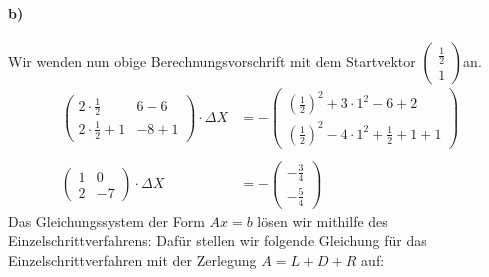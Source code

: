 \paragraph{b)}
Wir wenden nun obige Berechnungsvorschrift mit dem Startvektor $\begin{pmatrix}
\frac{1}{2}\\1
\end{pmatrix}$an.
\begin{align*}
 \begin{pmatrix}2 \cdot \frac{1}{2} & 6 - 6 \\ 2 \cdot \frac{1}{2} + 1 & -8 + 1 \end{pmatrix} \cdot \Delta X &= - \begin{pmatrix}(\frac{1}{2})^2 +3 \cdot1^2 - 6 + 2 \\ (\frac{1}{2})^2 - 4 \cdot 1^2 + \frac{1}{2} + 1 + 1\end{pmatrix} \\\\ \begin{pmatrix}1 & 0 \\ 2& -7 \end{pmatrix} \cdot \Delta X &=-\begin{pmatrix}-\frac{3}{4} \\ -\frac{5}{4}\end{pmatrix}
\end{align*}
Das Gleichungssystem der Form $Ax=b$ lösen wir mithilfe des Einzelschrittverfahrens:
Dafür stellen wir folgende Gleichung für das Einzelschrittverfahren mit der Zerlegung $A=L+D+R$ auf:
